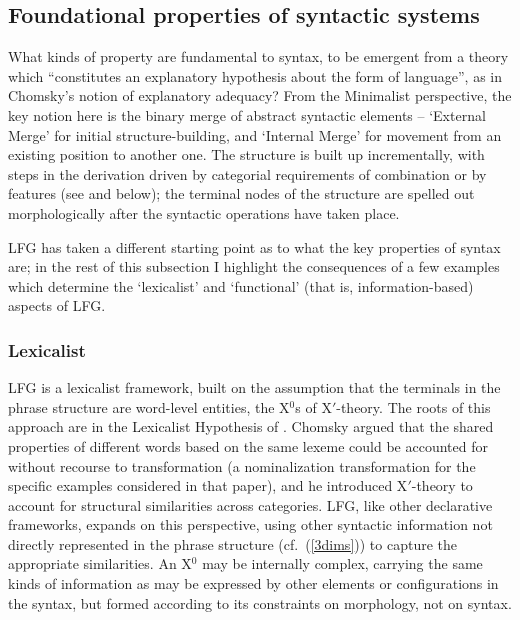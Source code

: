 \documentclass[output=paper,hidelinks]{langscibook}
\begin{document}
\subsection{Foundational properties of syntactic systems}

What kinds of property are fundamental to syntax, to be emergent from
a theory which ``constitutes an explanatory hypothesis about the form
of language'', as in Chomsky's notion of explanatory adequacy?  From
the Minimalist perspective, the key notion here is the binary merge of
abstract syntactic elements -- `External Merge' for initial
structure-building, and `Internal Merge' for movement from an existing
position to another one. The structure is built up incrementally, with
steps in the derivation driven by categorial requirements of
combination or by features (see  and
 below); the terminal nodes of the
structure are spelled out morphologically after the syntactic
operations have taken place.

LFG has taken a different starting point as to what the key properties
of syntax are; in the rest of this subsection I highlight the
consequences of a few examples which determine the `lexicalist' and
`functional' (that is, information-based) aspects of LFG.

\subsubsection{Lexicalist}

LFG is a lexicalist framework, built on the assumption that the
terminals in the phrase structure are word-level entities, the
X$^0$s of X$'$-theory. The roots of this approach are in the
Lexicalist Hypothesis of \citet{chomsky1970remarks}. Chomsky argued
that the shared properties of different words based on the same lexeme
could be accounted for without recourse to transformation (a
nominalization transformation for the specific examples considered in
that paper), and he introduced X$'$-theory to account for structural
similarities across categories. LFG, like other declarative
frameworks, expands on this perspective, using other syntactic
information not directly represented in the phrase structure
(cf.~(\ref{3dims})) to capture the appropriate similarities. An
X$^0$ may be internally complex, carrying the same kinds of
information as may be expressed by other elements or configurations in
the syntax, but formed according to its constraints on morphology, not
on syntax.
\end{document}
